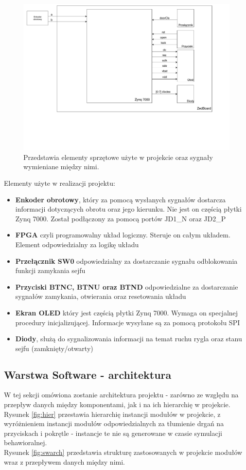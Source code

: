 \documentclass[12pt] {article}
\begin{document}
\begin{figure}[H]
\centering
\includegraphics[width=1.1\textwidth]{res/hardware_architecture.pdf}
\caption{Przedstawia elementy sprzętowe użyte w projekcie oraz sygnały wymieniane między nimi.} 
\end{figure}
\label{fig:hwarch}
\newpage

Elementy użyte w realizacji projektu:
\begin{itemize}
\item \textbf{Enkoder obrotowy}, który za pomocą wysłanych sygnałów dostarcza informacji dotyczących obrotu oraz jego kierunku. Nie jest on częścią płytki Zynq 7000. Został podłączony za pomocą portów JD1\_N oraz JD2\_P
\item \textbf{FPGA} czyli programowalny układ logiczny. Steruje on całym układem. Element odpowiedzialny za logikę układu
\item \textbf{Przełącznik SW0} odpowiedzialny za dostarczanie sygnału odblokowania funkcji zamykania sejfu
\item \textbf{Przyciski BTNC, BTNU oraz BTND} odpowiedzialne za dostarczanie sygnałów zamykania, otwierania oraz resetowania układu
\item \textbf{Ekran OLED} który jest częścią płytki Zynq 7000. Wymaga on specjalnej procedury inicjalizującej. Informacje wysyłane są za pomocą protokołu SPI
\item \textbf{Diody}, służą do sygnalizowania informacji na temat ruchu rygla oraz stanu sejfu (zamknięty/otwarty) 
\end{itemize}

\subsection{Warstwa Software - architektura}
W tej sekcji omówiona zostanie architektura projektu - zarówno ze względu na przepływ danych między komponentami, jak i na ich hierarchię w projekcie. \\
Rysunek \ref{fig:hier} przestawia hierarchię instancji modułów w projekcie, z wyróżnieniem instancji modułów odpowiedzialnych za tłumienie drgań na przyciskach i pokrętle - instancje te nie są generowane w czasie symulacji behawioralnej. \\
Rysunek \ref{fig:swarch} przedstawia strukturę zastosowanych w projekcie modułów wraz z przepływem danych między nimi. 
\end{document}
